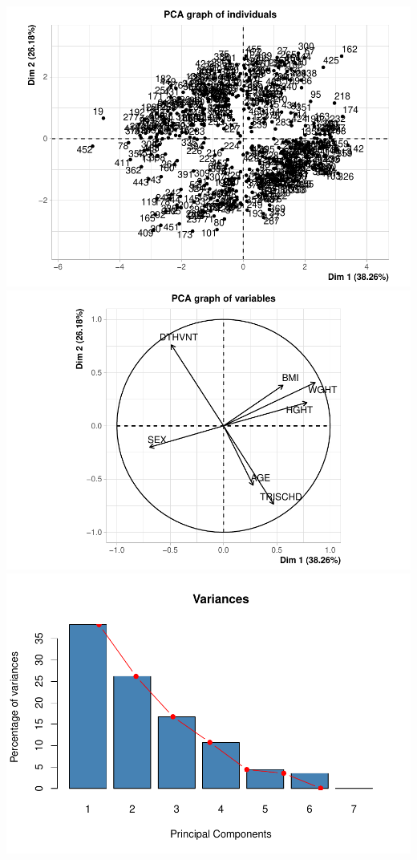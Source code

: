 \documentclass[
]{article}
\begin{document}
\includegraphics{Q1_markdown_files/figure-latex/unnamed-chunk-9-1.pdf}
\includegraphics{Q1_markdown_files/figure-latex/unnamed-chunk-9-2.pdf}
\includegraphics{Q1_markdown_files/figure-latex/unnamed-chunk-9-3.pdf}
\end{document}
